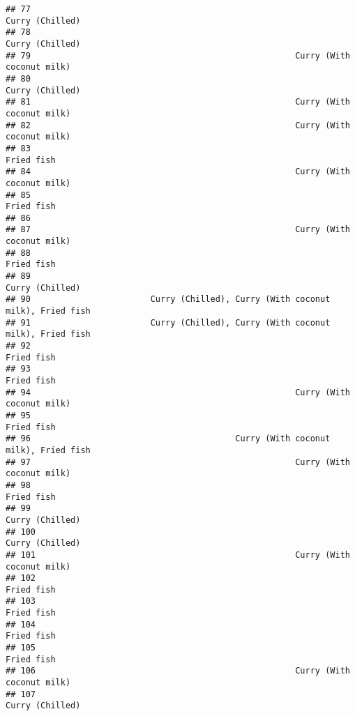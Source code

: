 \documentclass[
]{article}
\begin{document}
\begin{verbatim}
## 77                                                               Curry (Chilled)
## 78                                                               Curry (Chilled)
## 79                                                     Curry (With coconut milk)
## 80                                                               Curry (Chilled)
## 81                                                     Curry (With coconut milk)
## 82                                                     Curry (With coconut milk)
## 83                                                                    Fried fish
## 84                                                     Curry (With coconut milk)
## 85                                                                    Fried fish
## 86                                                                              
## 87                                                     Curry (With coconut milk)
## 88                                                                    Fried fish
## 89                                                               Curry (Chilled)
## 90                        Curry (Chilled), Curry (With coconut milk), Fried fish
## 91                        Curry (Chilled), Curry (With coconut milk), Fried fish
## 92                                                                    Fried fish
## 93                                                                    Fried fish
## 94                                                     Curry (With coconut milk)
## 95                                                                    Fried fish
## 96                                         Curry (With coconut milk), Fried fish
## 97                                                     Curry (With coconut milk)
## 98                                                                    Fried fish
## 99                                                               Curry (Chilled)
## 100                                                              Curry (Chilled)
## 101                                                    Curry (With coconut milk)
## 102                                                                   Fried fish
## 103                                                                   Fried fish
## 104                                                                   Fried fish
## 105                                                                   Fried fish
## 106                                                    Curry (With coconut milk)
## 107                                                              Curry (Chilled)

\end{verbatim}
\end{document}
